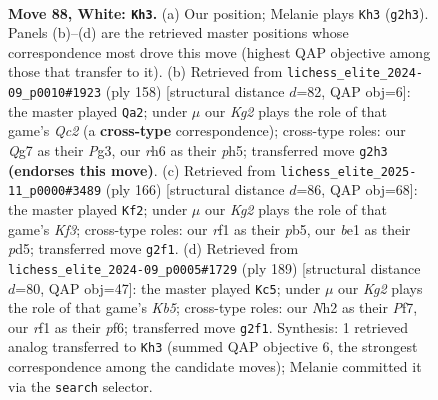 \documentclass[11pt]{article}
\begin{document}
\clearpage

\begin{figure}[p]\centering
\begin{subfigure}{0.46\textwidth}\centering
\resizebox{\linewidth}{!}{%
\newchessgame
\chessboard[
  setfen={4k3/p5Q1/7r/7P/3P4/4P3/3q2KN/4br2 w - - 3 88},
  showmover=false,
  pgfstyle=straightmove, color=movearrow, markmove={g2-h3}
]}
\caption{}
\end{subfigure}\hfill
\begin{subfigure}{0.46\textwidth}\centering
\resizebox{\linewidth}{!}{%
\newchessgame
\chessboard[
  setfen={8/1kp5/8/7p/7P/1r1q2P1/2Q2P1K/8 w - - 8 80},
  showmover=false,
  pgfstyle=straightmove, color=movearrow, markmove={c2-a2}
]}
\caption{}
\end{subfigure}
\\[4pt]
\begin{subfigure}{0.46\textwidth}\centering
\resizebox{\linewidth}{!}{%
\newchessgame
\chessboard[
  setfen={8/6k1/2Q1P2p/1pPp4/1P6/2q2K2/8/8 w - - 24 84},
  showmover=false,
  pgfstyle=straightmove, color=movearrow, markmove={f3-f2}
]}
\caption{}
\end{subfigure}\hfill
\begin{subfigure}{0.46\textwidth}\centering
\resizebox{\linewidth}{!}{%
\newchessgame
\chessboard[
  setfen={8/5p2/5P2/4q3/1kp2R2/1R6/2K5/8 b - - 39 95},
  showmover=false,
  pgfstyle=straightmove, color=movearrow, markmove={b4-c5}
]}
\caption{}
\end{subfigure}
\caption{\textbf{Move 88, White: \texttt{Kh3}.} (a) Our position; Melanie plays \texttt{Kh3} (\texttt{g2h3}). Panels (b)--(d) are the retrieved master positions whose correspondence most drove this move (highest QAP objective among those that transfer to it). (b) Retrieved from \texttt{lichess\_elite\_2024-09\_p0010\#1923} (ply 158) [structural distance $d$=82, QAP obj=6]: the master played \texttt{Qa2}; under $\mu$ our \emph{Kg2} plays the role of that game's \emph{Qc2} (a \textbf{cross-type} correspondence); cross-type roles: our \emph{Q}g7 as their \emph{P}g3, our \emph{r}h6 as their \emph{p}h5; transferred move \texttt{g2h3} \textbf{(endorses this move)}. (c) Retrieved from \texttt{lichess\_elite\_2025-11\_p0000\#3489} (ply 166) [structural distance $d$=86, QAP obj=68]: the master played \texttt{Kf2}; under $\mu$ our \emph{Kg2} plays the role of that game's \emph{Kf3}; cross-type roles: our \emph{r}f1 as their \emph{p}b5, our \emph{b}e1 as their \emph{p}d5; transferred move \texttt{g2f1}. (d) Retrieved from \texttt{lichess\_elite\_2024-09\_p0005\#1729} (ply 189) [structural distance $d$=80, QAP obj=47]: the master played \texttt{Kc5}; under $\mu$ our \emph{Kg2} plays the role of that game's \emph{Kb5}; cross-type roles: our \emph{N}h2 as their \emph{P}f7, our \emph{r}f1 as their \emph{p}f6; transferred move \texttt{g2f1}. Synthesis: 1 retrieved analog transferred to \texttt{Kh3} (summed QAP objective 6, the strongest correspondence among the candidate moves); Melanie committed it via the \texttt{search} selector.}
\label{fig:thought-m174}
\end{figure}
\end{document}
